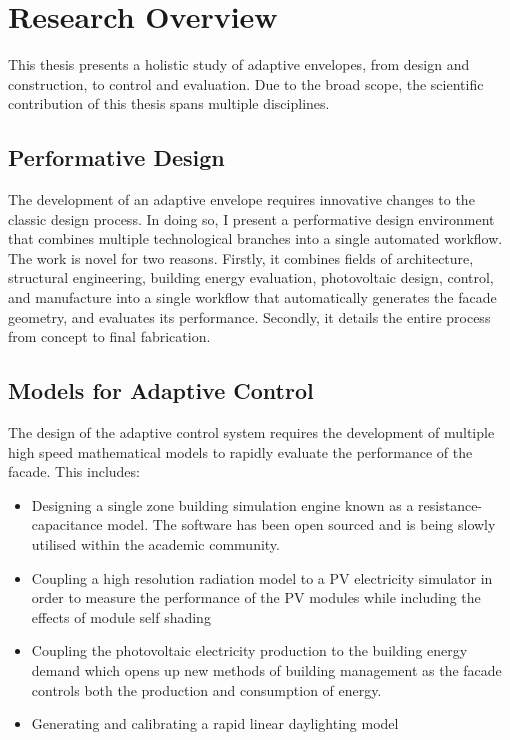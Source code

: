 \section{Research Overview}

This thesis presents a holistic study of adaptive envelopes, from design and construction, to control and evaluation. Due to the broad scope, the scientific contribution of this thesis spans multiple disciplines. 

\subsection{Performative Design}
The development of an adaptive envelope requires innovative changes to the classic design process. In doing so, I present a performative design environment that combines multiple technological branches into a single automated workflow. The work is novel for two reasons. Firstly, it combines fields of architecture, structural engineering, building energy evaluation, photovoltaic design, control, and manufacture into a single workflow that automatically generates the facade geometry, and evaluates its performance. Secondly, it details the entire process from concept to final fabrication. 


\subsection{Models for Adaptive Control}
The design of the adaptive control system requires the development of multiple high speed mathematical models to rapidly evaluate the performance of the facade. This includes:
\begin{itemize}
\item Designing a single zone building simulation engine known as a resistance-capacitance model. The software has been open sourced and is being slowly utilised within the academic community. 
\item Coupling a high resolution radiation model to a PV electricity simulator in order to measure the performance of the PV modules while including the effects of module self shading
\item Coupling the photovoltaic electricity production to the building energy demand which opens up new methods of building management as the facade controls both the production and consumption of energy. 
\item Generating and calibrating a rapid linear daylighting model 
\end{itemize}

